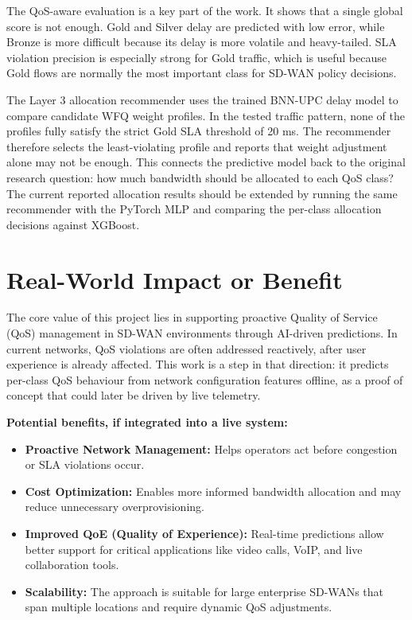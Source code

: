 \documentclass[a4paper,12pt]{Classes/RoboticsLaTeX}
\begin{document}
The QoS-aware evaluation is a key part of the work. It shows that a single global score is not enough. Gold and Silver delay are predicted with low error, while Bronze is more difficult because its delay is more volatile and heavy-tailed. SLA violation precision is especially strong for Gold traffic, which is useful because Gold flows are normally the most important class for SD-WAN policy decisions.

The Layer 3 allocation recommender uses the trained BNN-UPC delay model to compare candidate WFQ weight profiles. In the tested traffic pattern, none of the profiles fully satisfy the strict Gold SLA threshold of 20 ms. The recommender therefore selects the least-violating profile and reports that weight adjustment alone may not be enough. This connects the predictive model back to the original research question: how much bandwidth should be allocated to each QoS class? The current reported allocation results should be extended by running the same recommender with the PyTorch MLP and comparing the per-class allocation decisions against XGBoost.

\section{Real-World Impact or Benefit}

The core value of this project lies in supporting proactive Quality of Service (QoS) management in SD-WAN environments through AI-driven predictions. In current networks, QoS violations are often addressed reactively, after user experience is already affected. This work is a step in that direction: it predicts per-class QoS behaviour from network configuration features offline, as a proof of concept that could later be driven by live telemetry.

\textbf{Potential benefits, if integrated into a live system:}
\begin{itemize}
    \item \textbf{Proactive Network Management:} Helps operators act before congestion or SLA violations occur.
    \item \textbf{Cost Optimization:} Enables more informed bandwidth allocation and may reduce unnecessary overprovisioning.
    \item \textbf{Improved QoE (Quality of Experience):} Real-time predictions allow better support for critical applications like video calls, VoIP, and live collaboration tools.
    \item \textbf{Scalability:} The approach is suitable for large enterprise SD-WANs that span multiple locations and require dynamic QoS adjustments.
\end{itemize}
\end{document}
